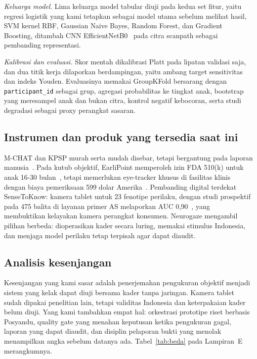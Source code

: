 \documentclass{article}
\begin{document}
\emph{Keluarga model.} Lima keluarga model tabular diuji pada kedua set fitur, yaitu regresi
logistik yang kami tetapkan sebagai model utama sebelum melihat hasil, SVM kernel RBF,
Gaussian Naive Bayes, Random Forest, dan Gradient Boosting, ditambah CNN
EfficientNetB0~\cite{tan2019} pada citra scanpath sebagai pembanding representasi.

\emph{Kalibrasi dan evaluasi.} Skor mentah dikalibrasi Platt pada lipatan validasi saja, dan
dua titik kerja dilaporkan berdampingan, yaitu ambang target sensitivitas dan indeks Youden.
Evaluasinya memakai GroupKFold bersarang dengan \texttt{participant\_id} sebagai grup,
agregasi probabilitas ke tingkat anak, bootstrap yang meresampel anak dan bukan citra,
kontrol negatif kebocoran, serta studi degradasi sebagai proxy perangkat sasaran.
\subsection{Instrumen dan produk yang tersedia saat ini}

M-CHAT dan KPSP murah serta mudah disebar, tetapi bergantung pada laporan
manusia~\cite{mardhika2022}. Pada kutub objektif, EarliPoint memperoleh izin FDA 510(k) untuk
anak 16-30 bulan~\cite{fda2022}, tetapi memerlukan eye-tracker khusus di fasilitas klinis
dengan biaya pemeriksaan 599 dolar Amerika~\cite{earlipoint2026}. Pembanding digital terdekat
SenseToKnow: kamera tablet untuk 23 fenotipe perilaku, dengan studi prospektif pada 475
balita di layanan primer AS melaporkan AUC 0,90~\cite{perochon2023}, yang membuktikan
kelayakan kamera perangkat konsumen. Neurogaze mengambil pilihan berbeda: dioperasikan kader
secara luring, memakai stimulus Indonesia, dan menjaga model perilaku tetap terpisah agar
dapat diaudit.

\subsection{Analisis kesenjangan}

Kesenjangan yang kami sasar adalah penerjemahan pengukuran objektif menjadi sistem yang
kelak dapat diuji bersama kader tanpa jaringan. Kamera tablet sudah dipakai penelitian lain,
tetapi validitas Indonesia dan keterpakaian kader belum diuji. Yang kami tambahkan empat hal:
orkestrasi prototipe riset berbasis Posyandu, quality gate yang menahan keputusan ketika
pengukuran gagal, laporan yang dapat diaudit, dan disiplin pelaporan bukti yang menolak
menampilkan angka sebelum datanya ada. Tabel~\ref{tab:beda} pada Lampiran~E merangkumnya.
\end{document}
